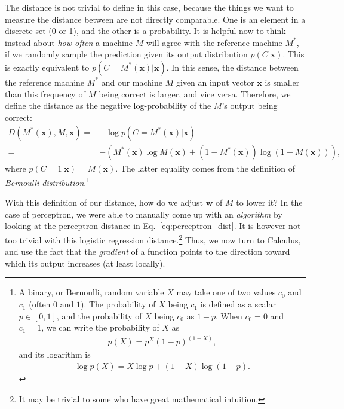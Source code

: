 \documentclass{report}
\newcommand{\vect}[1]{\mathbf{#1}}
\newcommand{\vx}[0]{\vect{x}}
\newcommand{\vw}[0]{\vect{w}}
\begin{document}
The distance is not trivial to define in this case, because the things we want
to measure the distance between are not directly comparable. One is an element
in a discrete set (0 or 1), and the other is a probability. It is helpful now to
think instead about {\it how often} a machine $M$ will agree with the reference
machine $M^*$, if we randomly sample the prediction given its output
distribution $p(C|\vx)$. This is exactly equivalent to $p(C=M^*(\vx)|\vx)$. In
this sense, the distance between the reference machine $M^*$ and our machine $M$
given an input vector $\vx$ is smaller than this frequency of $M$ being correct
is larger, and vice versa. Therefore, we define the distance as the negative
log-probability of the $M$'s output being correct:
\begin{align}
    \label{eq:logreg_dist}
    D(M^*(\vx), M, \vx) =& -\log p(C=M^*(\vx) | \vx) \\
    =& -(M^*(\vx) \log M(\vx) + (1-M^*(\vx)) \log (1- M(\vx))),
    \nonumber
\end{align}
where $p(C=1|\vx) = M(\vx)$. The latter equality comes from the definition of
{\it Bernoulli distribution}.\footnote{
    A binary, or Bernoulli, random variable $X$ may take one of two values $c_0$
    and $c_1$ (often $0$ and $1$). The probability of $X$ being $c_1$ is defined
    as a scalar $p \in \left[0, 1\right]$, and the probability of $X$ being $c_0$
    as $1-p$. When $c_0=0$ and $c_1=1$, we can write the probability of $X$ as
    \begin{align*}
        p(X) = p^X (1-p)^(1-X),
    \end{align*}
    and its logarithm is
    \begin{align*}
        \log p(X) = X \log p + (1-X) \log (1-p).
    \end{align*}
}

With this definition of our distance, how do we adjust $\vw$ of $M$ to lower it?
In the case of perceptron, we were able to manually come up with an {\it
algorithm} by looking at the perceptron distance in
Eq.~\eqref{eq:perceptron_dist}. It is however not too trivial with this logistic
regression distance.\footnote{
    It may be trivial to some who have great mathematical intuition.
}
Thus, we now turn to Calculus, and use the fact that the {\it gradient} of a
function points to the direction toward which its output increases (at least
locally). 
\end{document}
